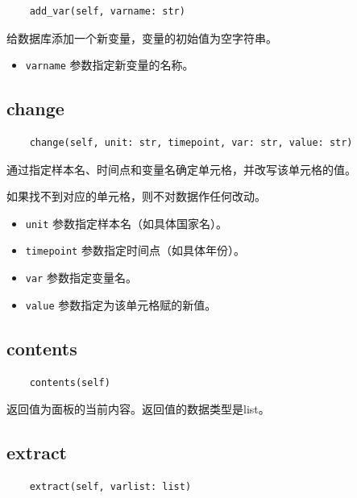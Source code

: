\documentclass[a4paper, UTF8, fontset=none]{ctexart}
\begin{document}
    \begin{lstlisting}
    add_var(self, varname: str)
    \end{lstlisting}    

    给数据库添加一个新变量，变量的初始值为空字符串。

    \begin{itemize}
        \item \verb|varname| 参数指定新变量的名称。
    \end{itemize}

\subsection{change}

    \begin{lstlisting}
    change(self, unit: str, timepoint, var: str, value: str)
    \end{lstlisting}    

    通过指定样本名、时间点和变量名确定单元格，并改写该单元格的值。

    如果找不到对应的单元格，则不对数据作任何改动。

    \begin{itemize}
        \item \verb|unit| 参数指定样本名（如具体国家名）。
        \item \verb|timepoint| 参数指定时间点（如具体年份）。
        \item \verb|var| 参数指定变量名。
        \item \verb|value| 参数指定为该单元格赋的新值。
    \end{itemize}

\subsection{contents}

    \begin{lstlisting}
    contents(self)
    \end{lstlisting}    

    返回值为面板的当前内容。返回值的数据类型是list。

\subsection{extract}

    \begin{lstlisting}
    extract(self, varlist: list)
    \end{lstlisting}    
\end{document}
